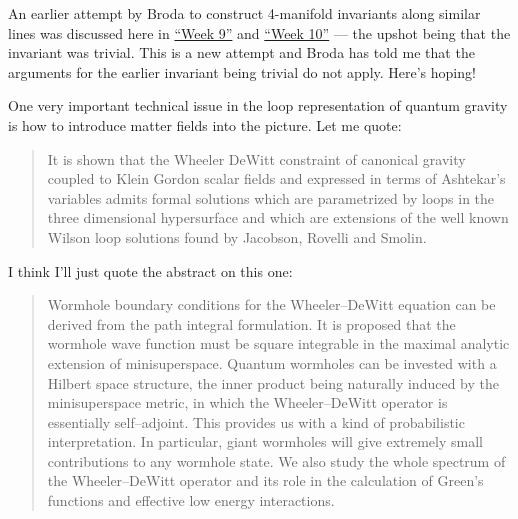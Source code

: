 \documentclass{article}
\def\tightlist{}
\renewcommand{\texttt}[1]{%
  \begingroup
  \ttfamily
  \begingroup\lccode`~=`/\lowercase{\endgroup\def~}{/\discretionary{}{}{}}%
  \begingroup\lccode`~=`[\lowercase{\endgroup\def~}{[\discretionary{}{}{}}%
  \begingroup\lccode`~=`.\lowercase{\endgroup\def~}{.\discretionary{}{}{}}%
  \catcode`/=\active\catcode`[=\active\catcode`.=\active
  \scantokens{#1\noexpand}%
  \endgroup
}
\begin{document}
\noindent
An earlier attempt by Broda to construct 4-manifold invariants along
similar lines was discussed here in \protect\hyperlink{week9}{``Week
9''} and \protect\hyperlink{week10}{``Week 10''} --- the upshot being
that the invariant was trivial. This is a new attempt and Broda has told
me that the arguments for the earlier invariant being trivial do not
apply. Here's hoping!

\noindent
One very important technical issue in the loop representation of quantum
gravity is how to introduce matter fields into the picture. Let me quote:

\begin{quote}
It is shown that the Wheeler DeWitt constraint of canonical gravity
coupled to Klein Gordon scalar fields and expressed in terms of
Ashtekar's variables admits formal solutions which are parametrized by
loops in the three dimensional hypersurface and which are extensions of
the well known Wilson loop solutions found by Jacobson, Rovelli and
Smolin.
\end{quote}

\noindent
I think I'll just quote the abstract on this one:

\begin{quote}
Wormhole boundary conditions for the Wheeler--DeWitt equation can be
derived from the path integral formulation. It is proposed that the
wormhole wave function must be square integrable in the maximal analytic
extension of minisuperspace. Quantum wormholes can be invested with a
Hilbert space structure, the inner product being naturally induced by
the minisuperspace metric, in which the Wheeler--DeWitt operator is
essentially self--adjoint. This provides us with a kind of probabilistic
interpretation. In particular, giant wormholes will give extremely small
contributions to any wormhole state. We also study the whole spectrum of
the Wheeler--DeWitt operator and its role in the calculation of Green's
functions and effective low energy interactions.
\end{quote}
\end{document}
